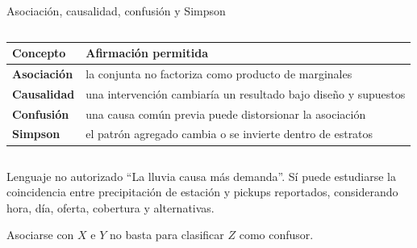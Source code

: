\documentclass[aspectratio=169,11pt]{beamer}
\begin{document}
\begin{frame}{Asociación, causalidad, confusión y Simpson}
  \footnotesize
  \begin{columns}[T]
      \begin{tabularx}{\textwidth}{>{\bfseries}p{} X}
        \toprule
        Concepto & Afirmación permitida \\
        \midrule
        Asociación & la conjunta no factoriza como producto de marginales \\
        Causalidad & una intervención cambiaría un resultado bajo diseño y supuestos \\
        Confusión & una causa común previa puede distorsionar la asociación \\
        Simpson & el patrón agregado cambia o se invierte dentro de estratos \\
        \bottomrule
      \end{tabularx}
      \centering
  \end{columns}
  \vspace{.5em}
  \begin{alertblock}{Lenguaje no autorizado}
    ``La lluvia causa más demanda''. Sí puede estudiarse la coincidencia entre precipitación de estación y pickups reportados, considerando hora, día, oferta, cobertura y alternativas.
  \end{alertblock}
  \centering Asociarse con $X$ e $Y$ no basta para clasificar $Z$ como confusor.
\end{frame}
\end{document}
